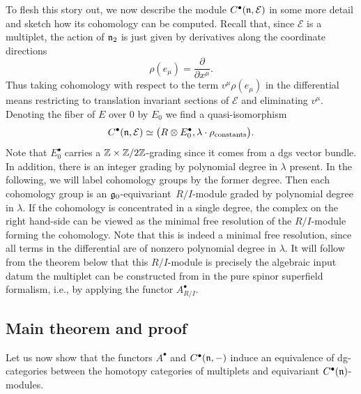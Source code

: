 \documentclass[pdftex]{sigma}
\numberwithin{equation}{section}
\def\cE{\mathcal E}\def\cF{\mathcal F}\def\cG{\mathcal G}\def\cH{\mathcal H}
\begin{document}
To flesh this story out, we now describe the module $C^\bullet(\fn , \cE)$ in some more detail and sketch how its cohomology can be computed. Recall that, since $\cE$ is a multiplet, the action of $\mathfrak n_2$ is just given by derivatives along the coordinate directions
\begin{equation*}
\rho(e_\mu) = \frac{\partial}{\partial x^\mu} .
\end{equation*}
Thus taking cohomology with respect to the term $v^\mu \rho(e_\mu)$ in the differential means restricting to translation invariant sections of $\cE$ and eliminating $v^\mu$. Denoting the fiber of $E$ over 0 by $E_0$ we find a quasi-isomorphism
\begin{equation} \label{eq: compute C^bu}
C^\bullet(\fn ,\cE) \simeq \big( R \otimes E_0^\bullet , \lambda \cdot \rho_{\mathrm{constants}} \big) .
\end{equation}
Note that $E_0^\bullet$ carries a $\mathbb Z \times \mathbb Z/2\mathbb Z$-grading since it comes from a dgs vector bundle. In addition, there is an integer grading by polynomial degree in $\lambda$ present. In the following, we will label cohomology groups by the former degree. Then each cohomology group is an $\mathfrak g_0$-equivariant~$R/I$-module graded by polynomial degree in $\lambda$. If the cohomology is concentrated in a single degree, the complex on the right hand-side can be viewed as the minimal free resolution of the $R/I$-module forming the cohomology. Note that this is indeed a minimal free resolution, since all terms in the differential are of nonzero polynomial degree in $\lambda$. It will follow from the theorem below that this $R/I$-module is precisely the algebraic input datum the multiplet can be constructed from in the pure spinor superfield formalism, i.e., by applying the functor $A^\bullet_{R/I}$.


\subsection{Main theorem and proof}
Let us now show that the functors $A^\bullet$ and $C^\bullet(\mathfrak n,-)$ induce an equivalence of dg-categories between the homotopy categories of multiplets and equivariant $C^\bullet({\mathfrak n})$-modules.
\end{document}
